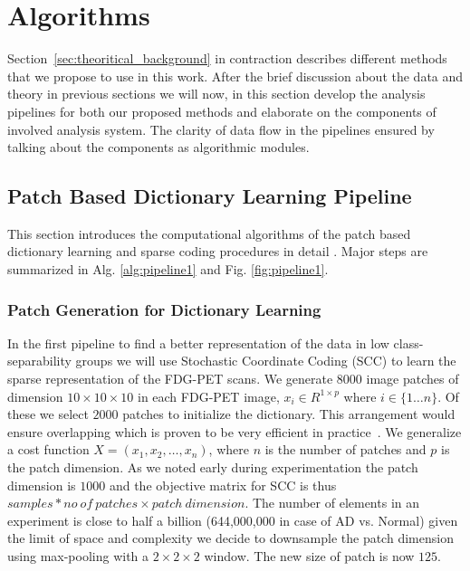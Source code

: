 \chapter{Algorithms}
\label{chapter:algorithm}

Section~\ref{sec:theoritical_background} in contraction describes different methods that we propose to use in this work. After the brief discussion about the data and theory in previous sections we will now, in this section develop the analysis pipelines for both our proposed methods and elaborate on the components of involved analysis system. The clarity of data flow in the pipelines ensured by talking about the components as algorithmic modules.


\section{Patch Based Dictionary Learning Pipeline}
\label{sec:scc}

This section introduces the computational algorithms of the patch based dictionary learning and sparse coding procedures in detail . Major steps are summarized in Alg. \ref{alg:pipeline1} and Fig. \ref{fig:pipeline1}. 

\subsection{Patch Generation for Dictionary Learning}
\label{subsec:Patch_Generation_Dictionary_Learning}
In the first pipeline to find a better representation of the data in low class-separability groups we will use Stochastic Coordinate Coding (SCC) to learn the sparse representation of the FDG-PET scans. We generate 8000 image patches of dimension $ 10 \times 10 \times 10 $ in each FDG-PET image, $ x_i \in R^{1 \times p} $ where $ i \in \{ 1 \dots n \}$. Of these we select $2000$ patches to initialize the dictionary. This arrangement would ensure overlapping which is proven to be very efficient in practice~\citep{lin2014stochastic,zhang2016applying}. We generalize a cost function $ X = (x_1,x_2,\dots,x_n) $, where $ n $ is the number of patches and $ p $ is the patch dimension. As we noted early during experimentation the patch dimension is $1000$ and the objective matrix for SCC is thus $samples*no~of~patches \times patch~dimension $. The number of elements in an experiment is close to half a billion (644,000,000 in case of AD vs. Normal) given the limit of space and complexity we decide to downsample the patch dimension using max-pooling with a $ 2 \times 2 \times 2 $ window. The new size of patch is now $ 125 $. 

